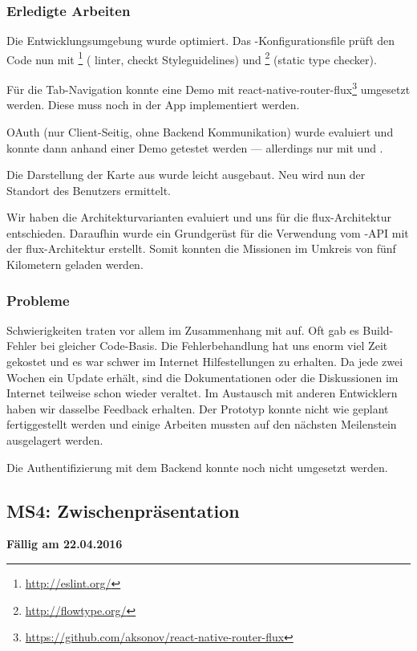 \subsubsection{Erledigte Arbeiten}
Die Entwicklungsumgebung wurde optimiert. Das -Konfigurationsfile prüft den Code nun mit \footnote{\url{http://eslint.org/}} ( linter, checkt Styleguidelines) und \footnote{\url{http://flowtype.org/}} (static type checker). 

Für die Tab-Navigation konnte eine Demo mit react-native-router-flux\footnote{\url{https://github.com/aksonov/react-native-router-flux}} umgesetzt werden. Diese muss noch in der \kort{} App implementiert werden. 

\gls{OAuth} (nur Client-Seitig, ohne Backend Kommunikation) wurde evaluiert und konnte dann anhand einer Demo getestet werden --- allerdings nur mit  und .

Die Darstellung der Karte aus  wurde leicht ausgebaut. Neu wird nun der Standort des Benutzers ermittelt.

Wir haben die Architekturvarianten evaluiert und uns für die flux-Architektur entschieden.
Daraufhin wurde ein Grundgerüst für die Verwendung vom \kort{}-API mit der flux-Architektur erstellt. 
Somit konnten die Missionen im Umkreis von fünf Kilometern geladen werden.

\subsubsection{Probleme}
Schwierigkeiten traten vor allem im Zusammenhang mit  auf.
Oft gab es Build-Fehler bei gleicher Code-Basis.
Die Fehlerbehandlung hat uns enorm viel Zeit gekostet und es war schwer im Internet Hilfestellungen zu erhalten.
Da  jede zwei Wochen ein Update erhält, sind die Dokumentationen oder die Diskussionen im Internet teilweise schon wieder veraltet.\newline
Im Austausch mit anderen  Entwicklern haben wir dasselbe Feedback erhalten.\newline
Der Prototyp konnte nicht wie geplant fertiggestellt werden und einige Arbeiten mussten auf den nächsten Meilenstein ausgelagert werden.

Die Authentifizierung mit dem Backend konnte noch nicht umgesetzt werden.

\subsection{MS4: Zwischenpräsentation}
\label{pm-ms4}
\textbf{Fällig am 22.04.2016}
